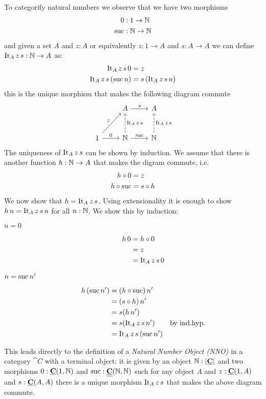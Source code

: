 To categorify natural numbers we observe that we have two morphisms
\begin{align*}
  0  & : 1 \to \mathbb{N} \\
  \mathrm{suc} & : \mathbb{N} \to \mathbb{N}
\end{align*}
and given a set $A$ and $z:A$ or equivalently $z : 1 \to A$ and $s : A \to A$ we can define $\mathrm{It}_A\,z\,s : \mathbb{N} \to A$ as:
\begin{align*}
\mathrm{It}_A\,z\,s\,0 & = z\\
\mathrm{It}_A\,z\,s\,(\mathrm{suc}\,n) & = s\,(\mathrm{It}_A\,z\,s\,n)
\end{align*}
this is the unique morphism that makes the following diagram commute
\[\begin{tikzcd}[row sep = large]
& A \arrow[r,"s"] & A \\
1 \arrow[ur,"z"] \arrow[r,"0"] & \Nat \arrow[r,"\suc"] \arrow[u, dashrightarrow,"\It_A\,z\,s" right] & \Nat  \arrow[u, dashrightarrow,"\It_A\,z\,s" right]
\end{tikzcd}\]  
The uniqueness of $\mathrm{It}_A\,z\,s$ can be shown by induction. We assume that there is another function $h : \mathbb{N} \to A$ that makes the digram commute, i.e. 
\begin{align*}
h \circ 0 & = z\\
h \circ \mathrm{suc} & = s \circ h
\end{align*}
We now show that $h = \mathrm{It}_A\,z\,s$. Using extensionality it is enough to show $h\,n = \mathrm{It}_A\,z\,s\,n$ for all $n:\mathbb{N}$. We show this by induction:
\begin{description}
\item[$n=0$] 
  \begin{align*}
    h\,0 & = h \circ 0 \\
    & = z\\
    & = \mathrm{It}_A\,z\,s\,0
  \end{align*}
\item[$n = \mathrm{suc}\,n'$] 
  \begin{align*}
    h\,(\mathrm{suc}\,n') & = (h \circ \mathrm{suc}) \, n' \\
    & = (s \circ h)\,n' \\
    & = s (h \, n')\\
    & = s (\mathrm{It}_A\,z\,s\,n') & \mbox{by ind.hyp.} \\
    & = \mathrm{It}_A\,z\,s\,(\mathrm{suc}\,n')
  \end{align*}
\end{description}

This leads directly to the definition of a \emph{Natural Number Object (NNO)} in a category $\cat{C}$ with a terminal object: it is given by an object $\mathbb{N} : |\underline{\mathbf{C}}|$ and two morphisms $0 : \underline{\mathbf{C}}(1,\mathbb{N})$ and $\mathrm{suc} : \underline{\mathbf{\underline{\mathbf{C}}}}(\mathbb{N},\mathbb{N})$ such for any object $A$ and $z : \underline{\mathbf{C}}(1,A)$ and $s:\underline{\mathbf{C}}(A,A)$ there is a unique morphism $\mathrm{It}_A\,z\,s$ that makes the above diagram commute.

